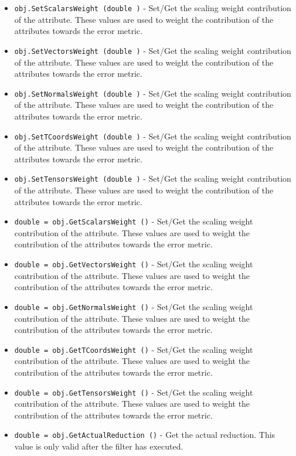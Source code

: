 \begin{itemize}
\item  \verb|obj.SetScalarsWeight (double )| -  Set/Get the scaling weight contribution of the attribute. These
 values are used to weight the contribution of the attributes
 towards the error metric.

\item  \verb|obj.SetVectorsWeight (double )| -  Set/Get the scaling weight contribution of the attribute. These
 values are used to weight the contribution of the attributes
 towards the error metric.

\item  \verb|obj.SetNormalsWeight (double )| -  Set/Get the scaling weight contribution of the attribute. These
 values are used to weight the contribution of the attributes
 towards the error metric.

\item  \verb|obj.SetTCoordsWeight (double )| -  Set/Get the scaling weight contribution of the attribute. These
 values are used to weight the contribution of the attributes
 towards the error metric.

\item  \verb|obj.SetTensorsWeight (double )| -  Set/Get the scaling weight contribution of the attribute. These
 values are used to weight the contribution of the attributes
 towards the error metric.

\item  \verb|double = obj.GetScalarsWeight ()| -  Set/Get the scaling weight contribution of the attribute. These
 values are used to weight the contribution of the attributes
 towards the error metric.

\item  \verb|double = obj.GetVectorsWeight ()| -  Set/Get the scaling weight contribution of the attribute. These
 values are used to weight the contribution of the attributes
 towards the error metric.

\item  \verb|double = obj.GetNormalsWeight ()| -  Set/Get the scaling weight contribution of the attribute. These
 values are used to weight the contribution of the attributes
 towards the error metric.

\item  \verb|double = obj.GetTCoordsWeight ()| -  Set/Get the scaling weight contribution of the attribute. These
 values are used to weight the contribution of the attributes
 towards the error metric.

\item  \verb|double = obj.GetTensorsWeight ()| -  Set/Get the scaling weight contribution of the attribute. These
 values are used to weight the contribution of the attributes
 towards the error metric.

\item  \verb|double = obj.GetActualReduction ()| -  Get the actual reduction. This value is only valid after the
 filter has executed.

\end{itemize}
